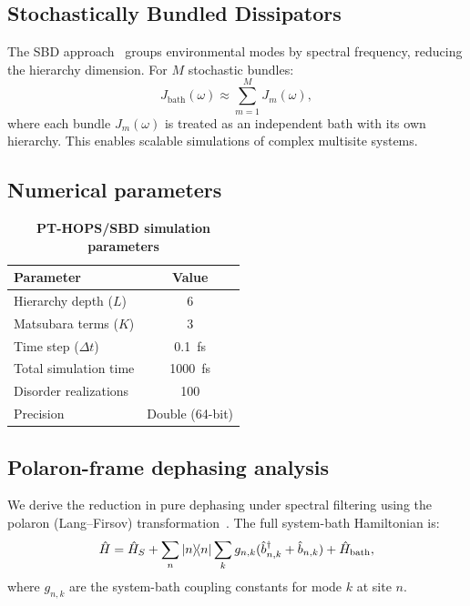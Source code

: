 \documentclass[11pt,a4paper]{article}
\begin{document}
\subsection{Stochastically Bundled Dissipators}

The SBD approach~\cite{Varvelo2021a} groups environmental modes by spectral frequency, reducing the hierarchy dimension. For $M$ stochastic bundles:
\begin{equation}
J_{\mathrm{bath}}(\omega) \approx \sum_{m=1}^{M} J_m(\omega),
\label{eq:SI_sbd}
\end{equation}
where each bundle $J_m(\omega)$ is treated as an independent bath with its own hierarchy. This enables scalable simulations of complex multisite systems.

\subsection{Numerical parameters}

\begin{table}[h]
\centering
\caption{\textbf{PT-HOPS/SBD simulation parameters}}
\label{tab:SI_parameters}
\begin{tabular}{lc}
\toprule
\textbf{Parameter} & \textbf{Value} \\
\midrule
Hierarchy depth ($L$) & 6 \\
Matsubara terms ($K$) & 3 \\
Time step ($\Delta t$) & \SI{0.1}{\femto\second} \\
Total simulation time & \SI{1000}{\femto\second} \\
Disorder realizations & 100 \\
Precision & Double (64-bit) \\
\bottomrule
\end{tabular}
\end{table}

\subsection{Polaron-frame dephasing analysis}
\label{sec:polaron_dephasing}

We derive the reduction in pure dephasing under spectral filtering using the polaron (Lang--Firsov) transformation~\cite{Huelga2013,Chin2011}. The full system-bath Hamiltonian is:
\begin{equation}
\hat{H} = \hat{H}_S + \sum_n \dyad{n} \sum_k g_{n,k}(\hat{b}_{n,k}^\dagger + \hat{b}_{n,k}) + \hat{H}_{\mathrm{bath}},
\label{eq:SI_full_hamiltonian}
\end{equation}
where $g_{n,k}$ are the system-bath coupling constants for mode $k$ at site $n$.
\end{document}
